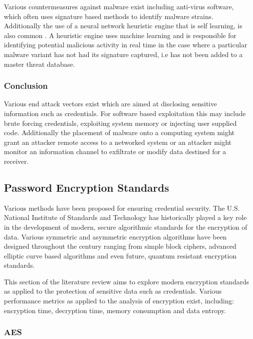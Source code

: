  
  Various countermeasures against malware exist including anti-virus software, which often uses signature based methods to identify malware strains. Additionally the use of a neural network heuristic engine that is self learning, is also common \cite{malware_2}. A heuristic engine uses machine learning and is responsible for identifying potential malicious activity in real time in the case where a particular malware variant has not had its signature captured, i.e has not been added to a master threat database.
 

\subsubsection{Conclusion}

Various end attack vectors exist which are aimed at disclosing sensitive information such as credentials. For software based exploitation this may include brute forcing credentials, exploiting system memory or injecting user supplied code. Additionally the placement of malware onto a computing system might grant an attacker remote access to a networked system or an attacker might monitor an information channel to exfiltrate or modify data destined for a receiver.  


\subsection{Password Encryption Standards}

Various methods have been proposed for ensuring credential security. The U.S. National Institute of Standards and Technology has historically played a key role in the development of modern, secure algorithmic standards for the encryption of data. Various symmetric and asymmetric encryption algorithms have been designed throughout the century\cite{encryption_standards} ranging from simple block ciphers, advanced elliptic curve based algorithms and even future, quantum resistant encryption standards.

This section of the literature review aims to explore modern encryption standards as applied to the protection of sensitive data such as credentials. Various performance metrics as applied to the analysis of encryption exist, including: encryption time, decryption time, memory consumption and data entropy.

\subsubsection{AES}

